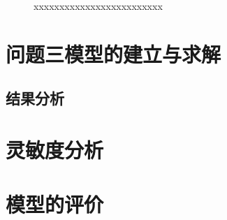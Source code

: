 \documentclass{whutmod}
\begin{document}
			\begin{figure}[H]	
				\centering
				\caption{xxxxxxxxxxxxxxxxxxxxxxxxx}
				\label{fisg}
			\end{figure}

    \section{问题三模型的建立与求解}
  		\subsection{结果分析}
  
  	\section{灵敏度分析}
 
  	\section{模型的评价}
\end{document}
